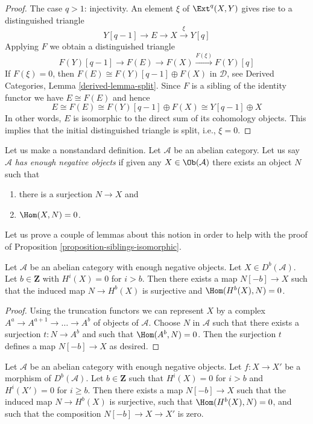 \begin{proof}
\medskip\noindent
The case $q > 1$: injectivity. An element $\xi$ of $\Ext^q(X, Y)$
gives rise to a distinguished triangle
$$
Y[q - 1] \to E \to X \xrightarrow{\xi} Y[q]
$$
Applying $F$ we obtain a distinguished triangle
$$
F(Y)[q - 1] \to F(E) \to F(X) \xrightarrow{F(\xi)} F(Y)[q]
$$
If $F(\xi) = 0$, then $F(E) \cong F(Y)[q - 1] \oplus F(X)$
in $\mathcal{D}$, see
Derived Categories, Lemma \ref{derived-lemma-split}.
Since $F$ is a sibling of the identity functor we have
$E \cong F(E)$ and hence
$$
E \cong F(E) \cong F(Y)[q - 1] \oplus F(X) \cong Y[q - 1] \oplus X
$$
In other words, $E$ is isomorphic to the
direct sum of its cohomology objects. This implies that the
initial distinguished triangle is split, i.e., $\xi = 0$.
\end{proof}

\noindent
Let us make a nonstandard definition. Let $\mathcal{A}$ be an abelian
category. Let us say $\mathcal{A}$ {\it has enough negative objects}
if given any $X \in \Ob(\mathcal{A})$ there exists an object $N$ such that
\begin{enumerate}
\item there is a surjection $N \to X$ and
\item $\Hom(X, N) = 0$.
\end{enumerate}
Let us prove a couple of lemmas about this notion in order to
help with the proof of Proposition \ref{proposition-siblings-isomorphic}.

\begin{lemma}
\label{lemma-good-map}
Let $\mathcal{A}$ be an abelian category with enough negative objects.
Let $X \in D^b(\mathcal{A})$. Let $b \in \mathbf{Z}$ with
$H^i(X) = 0$ for $i > b$. Then
there exists a map $N[-b] \to X$ such that the induced map
$N \to H^b(X)$ is surjective and $\Hom(H^b(X), N) = 0$.
\end{lemma}

\begin{proof}
Using the truncation functors we can represent $X$ by a complex
$A^a \to A^{a + 1} \to \ldots \to A^b$ of objects of $\mathcal{A}$.
Choose $N$ in $\mathcal{A}$ such that there exists a surjection
$t : N \to A^b$ and such that $\Hom(A^b, N) = 0$. Then the surjection $t$
defines a map $N[-b] \to X$ as desired.
\end{proof}

\begin{lemma}
\label{lemma-good-map-zero}
Let $\mathcal{A}$ be an abelian category with enough negative objects.
Let $f : X \to X'$ be a morphism of $D^b(\mathcal{A})$. Let $b \in \mathbf{Z}$
such that $H^i(X) = 0$ for $i > b$ and $H^i(X') = 0$ for $i \geq b$.
Then there exists a map $N[-b] \to X$ such that the induced map
$N \to H^b(X)$ is surjective, such that $\Hom(H^b(X), N) = 0$, and
such that the composition $N[-b] \to X \to X'$ is zero.
\end{lemma}

